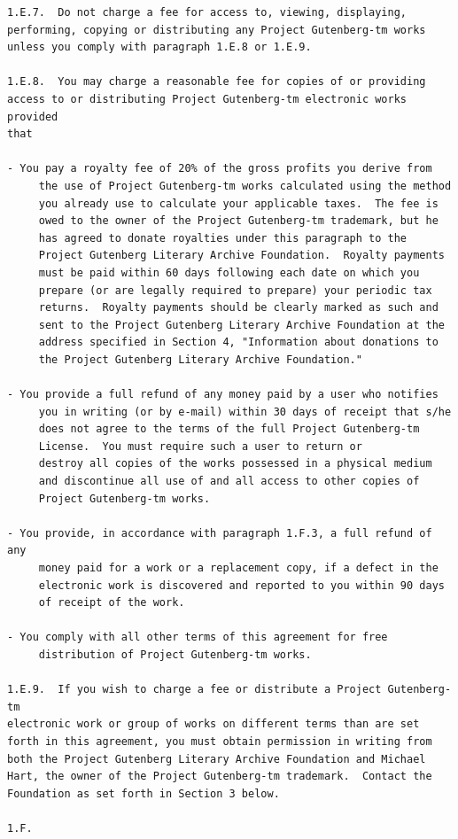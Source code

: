 \documentclass{book}
\begin{document}
\begin{verbatim}
1.E.7.  Do not charge a fee for access to, viewing, displaying,
performing, copying or distributing any Project Gutenberg-tm works
unless you comply with paragraph 1.E.8 or 1.E.9.

1.E.8.  You may charge a reasonable fee for copies of or providing
access to or distributing Project Gutenberg-tm electronic works provided
that

- You pay a royalty fee of 20% of the gross profits you derive from
     the use of Project Gutenberg-tm works calculated using the method
     you already use to calculate your applicable taxes.  The fee is
     owed to the owner of the Project Gutenberg-tm trademark, but he
     has agreed to donate royalties under this paragraph to the
     Project Gutenberg Literary Archive Foundation.  Royalty payments
     must be paid within 60 days following each date on which you
     prepare (or are legally required to prepare) your periodic tax
     returns.  Royalty payments should be clearly marked as such and
     sent to the Project Gutenberg Literary Archive Foundation at the
     address specified in Section 4, "Information about donations to
     the Project Gutenberg Literary Archive Foundation."

- You provide a full refund of any money paid by a user who notifies
     you in writing (or by e-mail) within 30 days of receipt that s/he
     does not agree to the terms of the full Project Gutenberg-tm
     License.  You must require such a user to return or
     destroy all copies of the works possessed in a physical medium
     and discontinue all use of and all access to other copies of
     Project Gutenberg-tm works.

- You provide, in accordance with paragraph 1.F.3, a full refund of any
     money paid for a work or a replacement copy, if a defect in the
     electronic work is discovered and reported to you within 90 days
     of receipt of the work.

- You comply with all other terms of this agreement for free
     distribution of Project Gutenberg-tm works.

1.E.9.  If you wish to charge a fee or distribute a Project Gutenberg-tm
electronic work or group of works on different terms than are set
forth in this agreement, you must obtain permission in writing from
both the Project Gutenberg Literary Archive Foundation and Michael
Hart, the owner of the Project Gutenberg-tm trademark.  Contact the
Foundation as set forth in Section 3 below.

1.F.


\end{verbatim}
\end{document}
